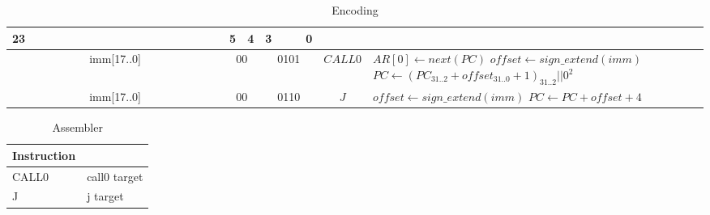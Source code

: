 	\begin{longtable}{llllllllllllllllllllllll  p{1cm}  p{7cm} | }
		\caption{Encoding\label{long}}\\
		23 & & & & & & & & & & & & & & & & & & 5 & 4 & 3 & & & 0 & &
		\multicolumn{1}{c}{}\\
		\hline
		\multicolumn{18}{|c|}{imm[17..0]} & \multicolumn{2}{c|}{00} & \multicolumn{4}{c|}{0101} & \multicolumn{1}{c|}{$CALL0$} & $AR[0] \leftarrow next(PC)$ \newline $offset \leftarrow sign\_extend(imm)$ \newline $PC \leftarrow (PC_{31..2}+offset_{31..0}+1)_{31..2}||0^2$\\ \hline
		\multicolumn{18}{|c|}{imm[17..0]} & \multicolumn{2}{c|}{00} & \multicolumn{4}{c|}{0110} & \multicolumn{1}{c|}{$J$} & $offset \leftarrow sign\_extend(imm)$ \newline $PC \leftarrow PC + offset + 4$\\ \hline
	\end{longtable}

	\begin{longtable}{|p{5cm}|p{5cm}|}
		\caption{Assembler\label{long}}\\
		\hline
		Instruction & \\
		\hline
		CALL0 & call0 target\\ \hline
		J & j target\\ \hline
	\end{longtable}

